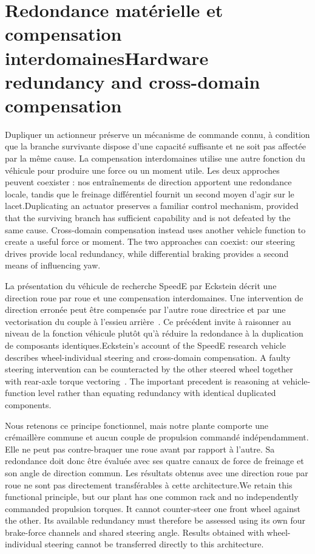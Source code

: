 \documentclass[11pt,a4paper,oneside]{report}
\newcommand{\bi}[2]{\iffrench #2\else #1\fi}
\renewcommand{\sec}[2]{\section{\bi{#1}{#2}}}
\begin{document}
\sec{Hardware redundancy and cross-domain compensation}{Redondance matérielle et compensation interdomaines}
\bi{Duplicating an actuator preserves a familiar control mechanism, provided that the surviving branch has sufficient capability and is not defeated by the same cause. Cross-domain compensation instead uses another vehicle function to create a useful force or moment. The two approaches can coexist: our steering drives provide local redundancy, while differential braking provides a second means of influencing yaw.}{Dupliquer un actionneur préserve un mécanisme de commande connu, à condition que la branche survivante dispose d'une capacité suffisante et ne soit pas affectée par la même cause. La compensation interdomaines utilise une autre fonction du véhicule pour produire une force ou un moment utile. Les deux approches peuvent coexister : nos entraînements de direction apportent une redondance locale, tandis que le freinage différentiel fournit un second moyen d'agir sur le lacet.}

\bi{Eckstein's account of the SpeedE research vehicle describes wheel-individual steering and cross-domain compensation. A faulty steering intervention can be counteracted by the other steered wheel together with rear-axle torque vectoring~\cite{eckstein}. The important precedent is reasoning at vehicle-function level rather than equating redundancy with identical duplicated components.}{La présentation du véhicule de recherche SpeedE par Eckstein décrit une direction roue par roue et une compensation interdomaines. Une intervention de direction erronée peut être compensée par l'autre roue directrice et par une vectorisation du couple à l'essieu arrière~\cite{eckstein}. Ce précédent invite à raisonner au niveau de la fonction véhicule plutôt qu'à réduire la redondance à la duplication de composants identiques.}

\bi{We retain this functional principle, but our plant has one common rack and no independently commanded propulsion torques. It cannot counter-steer one front wheel against the other. Its available redundancy must therefore be assessed using its own four brake-force channels and shared steering angle. Results obtained with wheel-individual steering cannot be transferred directly to this architecture.}{Nous retenons ce principe fonctionnel, mais notre plante comporte une crémaillère commune et aucun couple de propulsion commandé indépendamment. Elle ne peut pas contre-braquer une roue avant par rapport à l'autre. Sa redondance doit donc être évaluée avec ses quatre canaux de force de freinage et son angle de direction commun. Les résultats obtenus avec une direction roue par roue ne sont pas directement transférables à cette architecture.}
\end{document}
